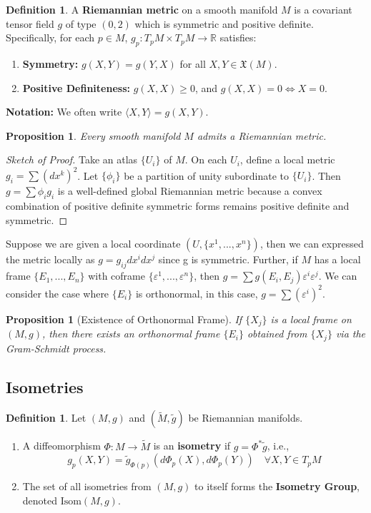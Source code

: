 \documentclass[11pt, a4paper]{article}
\theoremstyle{plain}
\newtheorem{proposition}[theorem]{Proposition}
\theoremstyle{definition}
\newtheorem{definition}[theorem]{Definition}
\theoremstyle{remark}
\begin{document}
\begin{definition}
A \textbf{Riemannian metric} on a smooth manifold $M$ is a covariant tensor field $g$ of type $(0,2)$ which is symmetric and positive definite.
Specifically, for each $p \in M$, $g_p: T_p M \times T_p M \to \mathbb{R}$ satisfies:
\begin{enumerate}
    \item \textbf{Symmetry:} $g(X, Y) = g(Y, X)$ for all $X, Y \in \mathfrak{X}(M)$.
    \item \textbf{Positive Definiteness:} $g(X, X) \ge 0$, and $g(X, X) = 0 \iff X = 0$.
\end{enumerate}
\end{definition}
\textbf{Notation:} We often write $\langle X, Y \rangle = g(X, Y)$.

\begin{proposition}
Every smooth manifold $M$ admits a Riemannian metric.
\end{proposition}
\begin{proof}[Sketch of Proof]
Take an atlas $\{U_i\}$ of $M$. On each $U_i$, define a local metric $g_i = \sum (dx^k)^2$. Let $\{\phi_i\}$ be a partition of unity subordinate to $\{U_i\}$. Then $g = \sum \phi_i g_i$ is a well-defined global Riemannian metric because a convex combination of positive definite symmetric forms remains positive definite and symmetric.
\end{proof}

Suppose we are given a local coordinate $(U,\{x^1,...,x^n\})$, then we can expressed the metric locally as $g = g_{ij}dx^i dx^j$ since g is symmetric. 
Further, if $M$ has a local frame $\{E_1,...,E_n\}$ with coframe $\{\varepsilon^1,...,\varepsilon^n\}$, then $g = \sum g(E_i, E_j) \varepsilon^i \varepsilon^j$. 
We can consider the case where $\{E_i\}$ is orthonormal, in this case, $g = \sum (\varepsilon^i)^2$.

\begin{proposition}[Existence of Orthonormal Frame]
    If $\{X_j\}$ is a local frame on $(M, g)$, then there exists an orthonormal frame $\{E_i\}$ obtained from $\{X_j\}$ via the Gram-Schmidt process.
\end{proposition}

\subsection{Isometries}

\begin{definition}
Let $(M, g)$ and $(\tilde{M}, \tilde{g})$ be Riemannian manifolds.
\begin{enumerate}
    \item A diffeomorphism $\Phi: M \to \tilde{M}$ is an \textbf{isometry} if $g = \Phi^* \tilde{g}$, i.e.,
    \[ g_p(X, Y) = \tilde{g}_{\Phi(p)}(d\Phi_p(X), d\Phi_p(Y)) \quad \forall X, Y \in T_p M \]
    \item The set of all isometries from $(M, g)$ to itself forms the \textbf{Isometry Group}, denoted $\text{Isom}(M, g)$.
\end{enumerate}
\end{definition}
\end{document}
